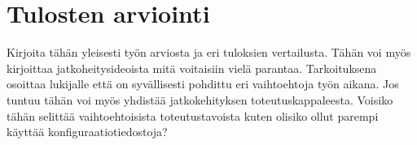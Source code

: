 \chapter{Tulosten arviointi}
Kirjoita tähän yleisesti työn arviosta ja eri tuloksien vertailusta. Tähän voi myös kirjoittaa jatkoheitysideoista mitä voitaisiin vielä parantaa. Tarkoituksena osoittaa lukijalle että on syvällisesti pohdittu eri vaihtoehtoja työn aikana. Jos tuntuu tähän voi myös yhdistää jatkokehityksen toteutuskappaleesta.
Voisiko tähän selittää vaihtoehtoisista toteutustavoista kuten olisiko ollut parempi käyttää konfiguraatiotiedostoja?